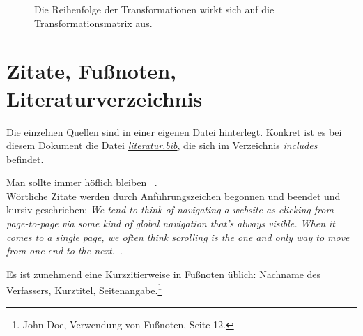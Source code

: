 \begin{figure}[htb]
  \centering
  \qquad
\qquad
  \label{fig:canvas_04}
\caption[]{Die Reihenfolge der Transformationen wirkt sich auf die Transformationsmatrix aus.}
\end{figure}


\section*{Zitate, Fußnoten, Literaturverzeichnis}

Die einzelnen Quellen sind in einer eigenen Datei hinterlegt. Konkret ist es bei diesem Dokument die Datei \href{"./includes/literatur.bib"}{\emph{literatur.bib}}, die sich im Verzeichnis \emph{includes} befindet.

Man sollte immer höflich bleiben ~\cite{autor:01}.\\

Wörtliche Zitate werden durch Anführungszeichen begonnen und beendet und kursiv geschrieben: \emph{\glqq We tend to think of navigating a website as clicking from page-to-page via some kind of global navigation that’s always visible. When it comes to a single page, we often think scrolling is the one and only way to move from one end to the next.\grqq}~\cite{smashing:01}.


Es ist zunehmend eine Kurzzitierweise in Fußnoten üblich: Nachname des Verfassers, Kurztitel, Seitenangabe.\footnote{John Doe, \glqq Verwendung von Fußnoten\grqq, Seite 12.}


